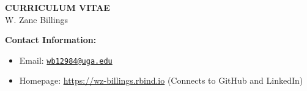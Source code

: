 \documentclass[11pt]{article}
\begin{document}
\begin{center}
\large{
	{\bf CURRICULUM VITAE} \\
	W. Zane Billings \\}
	\hrulefill
\end{center}

\normalsize

{\bf Contact Information:}
\begin{itemize}[noitemsep]
\item Email: \href{mailto:wb12984@uga.edu}{\texttt{wb12984@uga.edu}}
\item Homepage: \url{https://wz-billings.rbind.io} (Connects to GitHub and LinkedIn)
\end{itemize}

\vspace{0.2in}


\vspace{0.2in}


\vspace{0.2in}


\vspace{0.2in}


\vspace{0.2in}


%

\vspace{0.2in}

\end{document}
